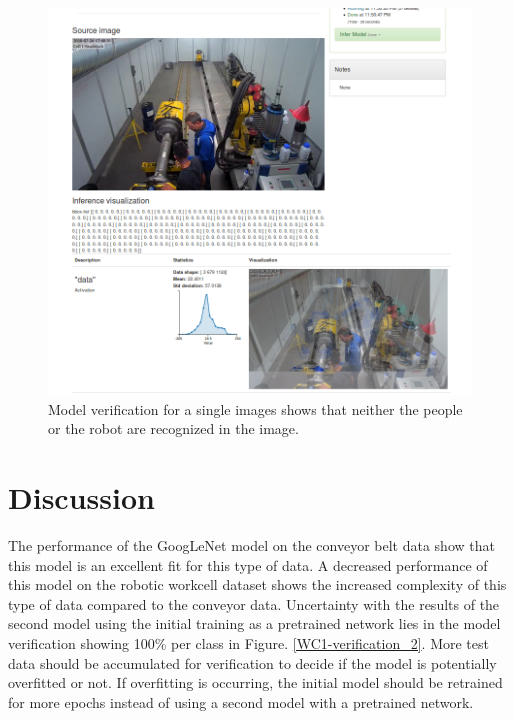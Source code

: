 \documentclass[10pt,journal,compsoc]{IEEEtran}
\begin{document}
\begin{figure}[thpb]
  \centering
  \includegraphics[width=\linewidth]{../img/Workcell2-Object-Detection/model/Workcell2-detectNet-ModelVerification01.png}
  \caption{Model verification for a single images shows that neither the people or the robot are recognized in the image.}
  \label{WC2-model-verif}
\end{figure}


\section{Discussion}
\label{sec:discussion}

The performance of the GoogLeNet model on the conveyor belt data show that this model is an excellent fit for this type of data. A decreased performance of this model on the robotic workcell dataset shows the increased complexity of this type of data compared to the conveyor data. Uncertainty with the results of the second model using the initial training as a pretrained network lies in the model verification showing 100\% per class in Figure. \ref{WC1-verification_2}. More test data should be accumulated for verification to decide if the model is potentially overfitted or not. If overfitting is occurring, the initial model should be retrained for more epochs instead of using a second model with a pretrained network.
\end{document}
